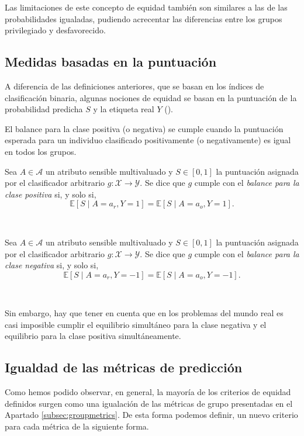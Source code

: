 \documentclass[oneside,openright,titlepage,numbers=noenddot,openany,headinclude,footinclude=true,
cleardoublepage=empty,abstractoff,BCOR=5mm,paper=a4,fontsize=12pt,main=spanish]{scrreprt}
\begin{document}
Las limitaciones de este concepto de equidad también son similares a las de las probabilidades igualadas, pudiendo acrecentar las diferencias entre los grupos privilegiado y desfavorecido.

\subsection{Medidas basadas en la puntuación}

A diferencia de las definiciones anteriores, que se basan en los índices de clasificación binaria, algunas nociones de equidad se basan en la puntuación de la probabilidad predicha $S$ y la etiqueta real $Y$ (\cite{catalogue2018}).

El balance para la clase positiva (o negativa) se cumple cuando la puntuación esperada para un individuo clasificado positivamente (o negativamente) es igual en todos los grupos.\\

\begin{definition}
Sea $A \in \mathcal{A}$ un atributo sensible multivaluado y $S\in [0,1]$ la puntuación asignada por el clasificador arbitrario $g\colon \mathcal{X} \to \mathcal{Y}$. Se dice que $g$ cumple con el \textit{balance para la clase positiva} si, y solo si, $$\mathbb{E}[S \mid A=a_r,Y=1]=\mathbb{E}[S \mid A=a_o,Y=1].$$
\end{definition}\

\begin{definition}
Sea $A \in \mathcal{A}$ un atributo sensible multivaluado y $S\in [0,1]$ la puntuación asignada por el clasificador arbitrario $g\colon \mathcal{X} \to \mathcal{Y}$. Se dice que $g$ cumple con el \textit{balance para la clase negativa} si, y solo si, $$\mathbb{E}[S \mid A=a_r, Y=-1]=\mathbb{E}[S \mid A=a_o, Y=-1].$$
\end{definition}\

Sin embargo, hay que tener en cuenta que
en los problemas del mundo real es casi imposible cumplir el equilibrio simultáneo para la clase negativa y el equilibrio para la clase positiva simultáneamente.

\clearpage

\subsection{Igualdad de las métricas de predicción}

Como hemos podido observar, en general, la mayoría de los criterios de equidad definidos surgen como una igualación de las métricas de grupo presentadas en el Apartado \ref{subsec:groupmetrics}. De esta forma podemos definir, un nuevo criterio para cada métrica de la siguiente forma.\\
\end{document}
